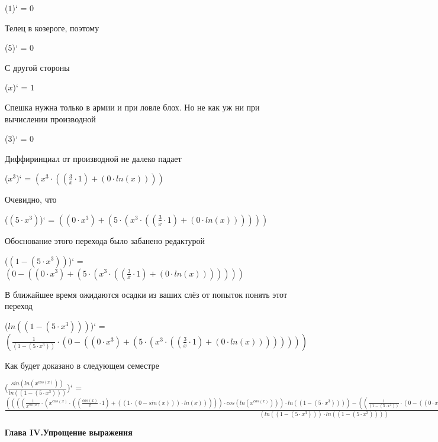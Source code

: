 \documentclass[12pt,a4paper,fleqn]{article}
\begin{document}
\begin{center}
($1$)`
 = $0$\end{center}
Телец в козероге, поэтому

\begin{center}
($5$)`
 = $0$\end{center}
С другой стороны

\begin{center}
($x$)`
 = $1$\end{center}
Спешка нужна только в армии и при ловле блох. Но не как уж ни при вычислении производной

\begin{center}
($3$)`
 = $0$\end{center}
Диффиринциал от производной не далеко падает

\begin{center}
($x^{3}$)`
 = $(x^{3} \cdot ((\frac{3}{x} \cdot 1) + (0 \cdot ln(x))))$\end{center}
Очевидно, что

\begin{center}
($(5 \cdot x^{3})$)`
 = $((0 \cdot x^{3}) + (5 \cdot (x^{3} \cdot ((\frac{3}{x} \cdot 1) + (0 \cdot ln(x))))))$\end{center}
Обоснование этого перехода было забанено редактурой

\begin{center}
($(1 - (5 \cdot x^{3}))$)`
 = $(0 - ((0 \cdot x^{3}) + (5 \cdot (x^{3} \cdot ((\frac{3}{x} \cdot 1) + (0 \cdot ln(x)))))))$\end{center}
В ближайшее время ожидаются осадки из ваших слёз от попыток понять этот переход

\begin{center}
($ln((1 - (5 \cdot x^{3})))$)`
 = $(\frac{1}{(1 - (5 \cdot x^{3}))} \cdot (0 - ((0 \cdot x^{3}) + (5 \cdot (x^{3} \cdot ((\frac{3}{x} \cdot 1) + (0 \cdot ln(x))))))))$\end{center}
Как будет доказано в следующем семестре

\begin{center}
($\frac{sin(ln(x^{cos(x)}))}{ln((1 - (5 \cdot x^{3})))}$)`
 = $\frac{((((\frac{1}{x^{cos(x)}} \cdot (x^{cos(x)} \cdot ((\frac{cos(x)}{x} \cdot 1) + ((1 \cdot (0 - sin(x))) \cdot ln(x))))) \cdot cos(ln(x^{cos(x)}))) \cdot ln((1 - (5 \cdot x^{3})))) - ((\frac{1}{(1 - (5 \cdot x^{3}))} \cdot (0 - ((0 \cdot x^{3}) + (5 \cdot (x^{3} \cdot ((\frac{3}{x} \cdot 1) + (0 \cdot ln(x)))))))) \cdot sin(ln(x^{cos(x)}))))}{(ln((1 - (5 \cdot x^{3}))) \cdot ln((1 - (5 \cdot x^{3}))))}$\end{center}
\newpage \textbf{\LARGE Глава IV.Упрощение выражения}
\end{document}
